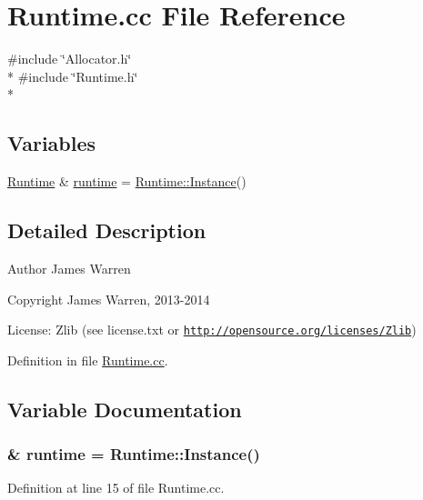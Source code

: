 \section{Runtime.\-cc File Reference}
\label{_runtime_8cc}
{\ttfamily \#include \char`\"{}Allocator.\-h\char`\"{}}\\*
{\ttfamily \#include \char`\"{}Runtime.\-h\char`\"{}}\\*
\subsection*{Variables}
\begin{DoxyCompactItemize}
\item 
\hyperlink{class_runtime}{Runtime} \& \hyperlink{_runtime_8cc_af1705ecc1d279440da4c3de49513a725}{runtime} = \hyperlink{class_runtime_a1146c295df34dff8c1935ec0436edd7d}{Runtime\-::\-Instance}()
\end{DoxyCompactItemize}


\subsection{Detailed Description}
\begin{DoxyAuthor}{Author}
James Warren 
\end{DoxyAuthor}
\begin{DoxyCopyright}{Copyright}
James Warren, 2013-\/2014 
\end{DoxyCopyright}
\begin{DoxyParagraph}{License\-:}
Zlib (see license.\-txt or \href{http://opensource.org/licenses/Zlib}{\tt http\-://opensource.\-org/licenses/\-Zlib}) 
\end{DoxyParagraph}


Definition in file \hyperlink{_runtime_8cc_source}{Runtime.\-cc}.



\subsection{Variable Documentation}
\subsubsection[{runtime}]{\& runtime = {\bf Runtime\-::\-Instance}()}\label{_runtime_8cc_af1705ecc1d279440da4c3de49513a725}


Definition at line 15 of file Runtime.\-cc.

